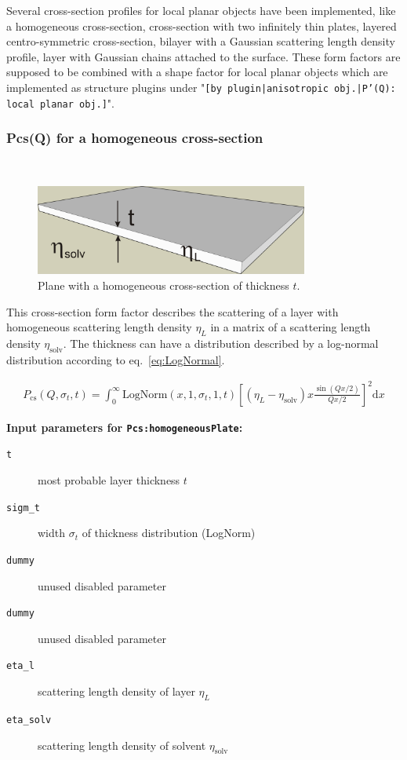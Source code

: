 Several cross-section profiles for local planar objects have been implemented,
like a homogeneous cross-section,
cross-section with two infinitely thin plates,
layered centro-symmetric cross-section,
bilayer with a Gaussian scattering length density profile,
layer with Gaussian chains attached to the surface.
These form factors are supposed to be combined with a shape factor for
local planar objects which are implemented as structure  plugins
under "\texttt{[by plugin|anisotropic obj.|P'(Q): local planar
obj.]}".

\clearpage

\subsubsection{Pcs(Q) for a homogeneous cross-section}
\label{plugin:Pcs:homogeneousXS} ~\\

\begin{figure}[htb]
\begin{center}
\includegraphics[width=0.802\textwidth,height=0.265\textwidth]{../images/form_factor/anisotropic/Pcs_homogeneousXS_txt.png}
\end{center}
\caption{Plane with a homogeneous cross-section of thickness $t$.}
\label{fig:homogeneousXS}
\end{figure}

This cross-section form factor describes the scattering of a layer with homogeneous
scattering length density $\eta_L$ in a matrix of a scattering length density $\eta_\textrm{solv}$.
The thickness can have a distribution described by a log-normal distribution according to eq.\ \ref{eq:LogNormal}.

\begin{align}
P_\text{cs}(Q,\sigma_{t},t) = \int_0^\infty \textrm{LogNorm}(x,1,\sigma_{t},1,t)
    \left[ \left(\eta_L-\eta_\textrm{solv}\right) x \frac{\sin(Qx/2)}{Qx/2} \right]^2\textrm{d}x
\end{align}

\noindent
\textbf{Input parameters for \texttt{Pcs:homogeneousPlate}:}
\begin{description}
    \item[\texttt{t}] most probable layer thickness $t$
    \item[\texttt{sigm\_t}] width $\sigma_t$ of thickness distribution (LogNorm)
    \item[\texttt{dummy}] unused disabled parameter
    \item[\texttt{dummy}] unused disabled parameter
    \item[\texttt{eta\_l}] scattering length density of layer $\eta_L$
    \item[\texttt{eta\_solv}] scattering length density of solvent $\eta_\textrm{solv}$
\end{description}

